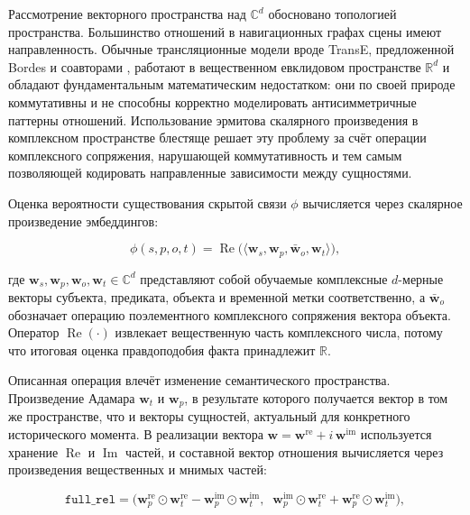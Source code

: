 Рассмотрение векторного пространства над $\displaystyle \mathbb{C}^d$ обосновано топологией пространства. Большинство отношений в навигационных графах сцены имеют направленность. Обычные трансляционные модели вроде TransE, предложенной Bordes и соавторами \cite{ref52}, работают в вещественном евклидовом пространстве $\displaystyle \mathbb{R}^d$ и обладают фундаментальным математическим недостатком: они по своей природе коммутативны и не способны корректно моделировать антисимметричные паттерны отношений. Использование эрмитова скалярного произведения в комплексном пространстве блестяще решает эту проблему за счёт операции комплексного сопряжения, нарушающей коммутативность и тем самым позволяющей кодировать направленные зависимости между сущностями.

Оценка вероятности существования скрытой связи $\displaystyle \phi$ вычисляется через скалярное произведение эмбеддингов:

\begin{equation}
    \phi(s,p,o,t) = \operatorname{Re}\bigl(\langle\mathbf{w}_s, \mathbf{w}_p, \bar{\mathbf{w}}_o, \mathbf{w}_{t}\rangle\bigr),
    \label{eq:tcomplex_score}
\end{equation}

где $\displaystyle \mathbf{w}_s, \mathbf{w}_p, \mathbf{w}_o, \mathbf{w}_{t} \in \mathbb{C}^d$ представляют собой обучаемые комплексные $\displaystyle d$-мерные векторы субъекта, предиката, объекта и временной метки соответственно, а $\displaystyle \bar{\mathbf{w}}_o$ обозначает операцию поэлементного комплексного сопряжения вектора объекта. Оператор $\displaystyle \operatorname{Re}(\cdot)$ извлекает вещественную часть комплексного числа, потому что итоговая оценка правдоподобия факта принадлежит $\displaystyle \mathbb{R}$.

Описанная операция влечёт изменение семантического пространства. Произведение Адамара $\displaystyle \mathbf{w}_{t}$ и $\displaystyle \mathbf{w}_p$, в результате которого получается вектор в том же пространстве, что и векторы сущностей, актуальный для конкретного исторического момента. В реализации вектора $\displaystyle \mathbf{w} = \mathbf{w}^{\text{re}} + i\,\mathbf{w}^{\text{im}}$ используется хранение $\operatorname{Re}$ и $\operatorname{Im}$ частей, и составной вектор отношения вычисляется через произведения вещественных и мнимых частей:

\begin{equation}
    \texttt{full\_rel} = \bigl(\mathbf{w}_p^{\text{re}} \odot \mathbf{w}_t^{\text{re}} - \mathbf{w}_p^{\text{im}} \odot \mathbf{w}_t^{\text{im}},\;\; \mathbf{w}_p^{\text{im}} \odot \mathbf{w}_t^{\text{re}} + \mathbf{w}_p^{\text{re}} \odot \mathbf{w}_t^{\text{im}}\bigr),
    \label{eq:full_rel}
\end{equation}

